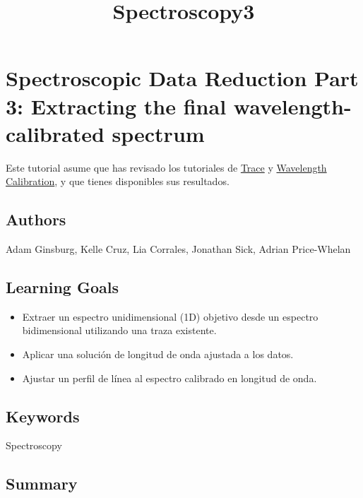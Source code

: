 \documentclass[11pt]{article}
\title{Spectroscopy3}
\providecommand{\tightlist}{%
      \setlength{\itemsep}{0pt}\setlength{\parskip}{0pt}}
\begin{document}
    
    \maketitle
    
    

    
    \hypertarget{spectroscopic-data-reduction-part-3-extracting-the-final-wavelength-calibrated-spectrum}{%
\section{Spectroscopic Data Reduction Part 3: Extracting the final
wavelength-calibrated
spectrum}\label{spectroscopic-data-reduction-part-3-extracting-the-final-wavelength-calibrated-spectrum}}

Este tutorial asume que has revisado los tutoriales de
\href{1-SpectroscopicTraceTutorial.ipynb}{Trace} y
\href{2-WavelengthCalibration}{Wavelength Calibration}, y que tienes
disponibles sus resultados.

\hypertarget{authors}{%
\subsection{Authors}\label{authors}}

Adam Ginsburg, Kelle Cruz, Lia Corrales, Jonathan Sick, Adrian
Price-Whelan

\hypertarget{learning-goals}{%
\subsection{Learning Goals}\label{learning-goals}}

\begin{itemize}
\tightlist
\item
  Extraer un espectro unidimensional (1D) objetivo desde un espectro
  bidimensional utilizando una traza existente.
\item
  Aplicar una solución de longitud de onda ajustada a los datos.
\item
  Ajustar un perfil de línea al espectro calibrado en longitud de onda.
\end{itemize}

\hypertarget{keywords}{%
\subsection{Keywords}\label{keywords}}

Spectroscopy

\hypertarget{summary}{%
\subsection{Summary}\label{summary}}
\end{document}
